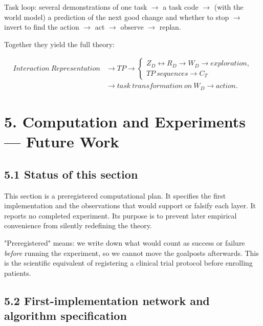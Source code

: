 \documentclass[11pt]{article}
\newenvironment{plainword}{%
  \par\medskip\noindent\begin{minipage}{\textwidth}%
  \color{gray!75!black}\small\itshape
}{%
  \end{minipage}\par\medskip}
\begin{document}
\begin{plainword}
Task loop: several demonstrations of one task $\to$ a task code $\to$ (with the world model) a prediction of the next good change and
whether to stop $\to$ invert to find the action $\to$ act $\to$ observe $\to$ replan.
\end{plainword}

Together they yield the full theory:

\[
\boxed{
\begin{aligned}
Interaction\ Representation&\rightarrow TP
\rightarrow
\left\{
\begin{array}{l}
Z_D\leftrightarrow R_D\rightarrow W_D\rightarrow exploration,\\
TP\ sequences\rightarrow C_T
\end{array}
\right.\\
&\rightarrow task\ transformation\ on\ W_D
\rightarrow action.
\end{aligned}}
\]

\section*{5. Computation and Experiments --- Future Work}

\subsection*{5.1 Status of this section}

This section is a preregistered computational plan. It specifies the first implementation and the observations that would support or
falsify each layer. It reports no completed experiment. Its purpose is to prevent later empirical convenience from silently
redefining the theory.

\begin{plainword}
"Preregistered" means: we write down what would count as success or failure \emph{before} running the experiment, so we cannot move
the goalposts afterwards. This is the scientific equivalent of registering a clinical trial protocol before enrolling patients.
\end{plainword}

\subsection*{5.2 First-implementation network and algorithm specification}
\end{document}

